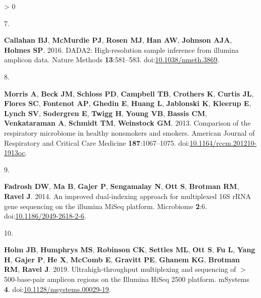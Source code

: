 \documentclass[
]{article}
\newlength{\cslhangindent}
\newlength{\csllabelwidth}
\newenvironment{CSLReferences}[3] %
 {%
  \setlength{\parindent}{0pt}
  \ifodd #1 \everypar{\setlength{\hangindent}{\cslhangindent}}\ignorespaces\fi
  \ifnum #2 > 0
  \setlength{\parskip}{#2\baselineskip}
  \fi
 }%
 {}
\newcommand{\CSLLeftMargin}[1]{\parbox[t]{\csllabelwidth}{#1}}
\newcommand{\CSLRightInline}[1]{\parbox[t]{\linewidth - \csllabelwidth}{#1}}
\begin{document}
\begin{CSLReferences}{0}{0}
\leavevmode\hypertarget{ref-Callahan2016}{}%
\CSLLeftMargin{7. }
\CSLRightInline{\textbf{Callahan BJ}, \textbf{McMurdie PJ},
\textbf{Rosen MJ}, \textbf{Han AW}, \textbf{Johnson AJA}, \textbf{Holmes
SP}. 2016. {DADA}2: High-resolution sample inference from illumina
amplicon data. Nature Methods \textbf{13}:581--583.
doi:\href{https://doi.org/10.1038/nmeth.3869}{10.1038/nmeth.3869}.}

\leavevmode\hypertarget{ref-Morris2013}{}%
\CSLLeftMargin{8. }
\CSLRightInline{\textbf{Morris A}, \textbf{Beck JM}, \textbf{Schloss
PD}, \textbf{Campbell TB}, \textbf{Crothers K}, \textbf{Curtis JL},
\textbf{Flores SC}, \textbf{Fontenot AP}, \textbf{Ghedin E},
\textbf{Huang L}, \textbf{Jablonski K}, \textbf{Kleerup E},
\textbf{Lynch SV}, \textbf{Sodergren E}, \textbf{Twigg H}, \textbf{Young
VB}, \textbf{Bassis CM}, \textbf{Venkataraman A}, \textbf{Schmidt TM},
\textbf{Weinstock GM}. 2013. Comparison of the respiratory microbiome in
healthy nonsmokers and smokers. American Journal of Respiratory and
Critical Care Medicine \textbf{187}:1067--1075.
doi:\href{https://doi.org/10.1164/rccm.201210-1913oc}{10.1164/rccm.201210-1913oc}.}

\leavevmode\hypertarget{ref-Fadrosh2014}{}%
\CSLLeftMargin{9. }
\CSLRightInline{\textbf{Fadrosh DW}, \textbf{Ma B}, \textbf{Gajer P},
\textbf{Sengamalay N}, \textbf{Ott S}, \textbf{Brotman RM},
\textbf{Ravel J}. 2014. An improved dual-indexing approach for
multiplexed 16S {rRNA} gene sequencing on the illumina {MiSeq} platform.
Microbiome \textbf{2}:6.
doi:\href{https://doi.org/10.1186/2049-2618-2-6}{10.1186/2049-2618-2-6}.}

\leavevmode\hypertarget{ref-Holm2019}{}%
\CSLLeftMargin{10. }
\CSLRightInline{\textbf{Holm JB}, \textbf{Humphrys MS}, \textbf{Robinson
CK}, \textbf{Settles ML}, \textbf{Ott S}, \textbf{Fu L}, \textbf{Yang
H}, \textbf{Gajer P}, \textbf{He X}, \textbf{McComb E}, \textbf{Gravitt
PE}, \textbf{Ghanem KG}, \textbf{Brotman RM}, \textbf{Ravel J}. 2019.
Ultrahigh-throughput multiplexing and sequencing of \(>\)500-base-pair
amplicon regions on the {Illumina} {HiSeq} 2500 platform. {mSystems}
\textbf{4}.
doi:\href{https://doi.org/10.1128/msystems.00029-19}{10.1128/msystems.00029-19}.}


\end{CSLReferences}
\end{document}

